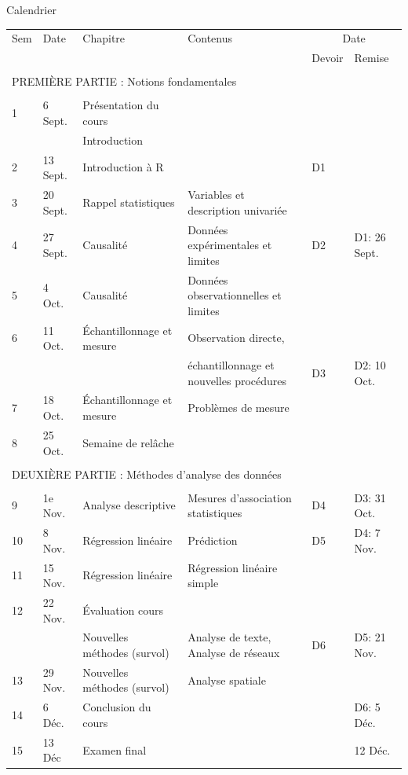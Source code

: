 \documentclass[xcolor=table]{beamer}
\begin{document}
\begin{frame}{Calendrier}
\tiny
\begin{table}%
\begin{tabular}{llllll}

\hline
\hline 
Sem & Date & Chapitre & Contenus & \multicolumn{2}{c}{Date} \tabularnewline
\cline{5-6}

& & &  & Devoir & Remise \\
\hline
& & & & & \\
\multicolumn{6}{l}{PREMIÈRE PARTIE : Notions fondamentales}  \\
& & & & & \\
1 & 6 Sept. & Présentation du cours \\
& & Introduction & & & \\
2 & 13 Sept. & Introduction à R &  & D1 & \\
3 & 20 Sept. & Rappel statistiques	& Variables et description univariée &  & \\
4 & 27 Sept. & Causalité & Données expérimentales et limites &  D2 & D1: 26 Sept. \\
5 & 4 Oct. & Causalité & Données observationnelles et limites & & \\
6 & 11 Oct. & Échantillonnage et mesure & Observation directe, \\
& & & échantillonnage et nouvelles procédures & D3 & D2: 10 Oct. \\
7 & 18 Oct. & Échantillonnage et mesure	& Problèmes de mesure \\
8 & 25 Oct. & Semaine de relâche & & & \\
\\
\multicolumn{6}{l}{DEUXIÈRE PARTIE : Méthodes d'analyse des données}  \\
\\
9 & 1e Nov. & Analyse descriptive & Mesures d'association statistiques & D4	& D3: 31 Oct. \\
10 & 8 Nov. & Régression linéaire & Prédiction & D5 & D4: 7 Nov. \\
11 & 15 Nov. & Régression linéaire & Régression linéaire simple & & \\
12 & 22 Nov. & Évaluation cours \\
& & Nouvelles méthodes (survol) & Analyse de texte, Analyse de réseaux & D6 & D5: 21 Nov. \\
13 & 29 Nov. & Nouvelles méthodes (survol) & Analyse spatiale \\
14 & 6 Déc. & Conclusion du cours & & & D6: 5 Déc. \\
15 & 13 Déc & Examen final & & & 12 Déc.\\

\hline
\hline

\end{tabular}
\end{table}
\vskip 1cm
\end{frame}
\end{document}
